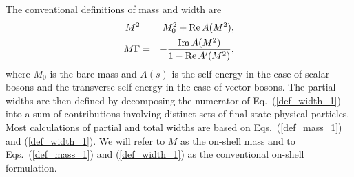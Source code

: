 \documentclass[a4paper,12pt]{article}
\begin{document}
The conventional definitions of mass and width are
\begin{eqnarray}
\label{def_mass_1}
M^2&=&M^2_0+{\rm Re}\, A(M^2),\\
\label{def_width_1}
M\Gamma&=&-\frac{{\rm Im}\, A(M^2)}{1-{\rm Re}\, A'(M^2)},  
\end{eqnarray}
where $M_0$ is the bare mass and $A(s)$ is the self-energy in the case of
scalar bosons and the transverse self-energy in the case of vector bosons.
The partial widths are then defined by decomposing the numerator of
Eq.~(\ref{def_width_1}) into a sum of contributions involving distinct sets of
final-state physical particles.
Most calculations of partial and total widths are based on
Eqs.~(\ref{def_mass_1}) and (\ref{def_width_1}).
We will refer to $M$ as the on-shell mass and to Eqs.~(\ref{def_mass_1}) and
(\ref{def_width_1}) as the conventional on-shell formulation.
\end{document}
